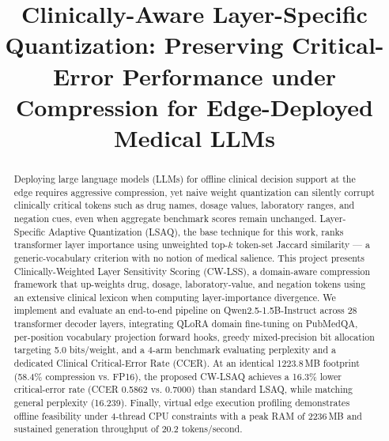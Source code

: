 \documentclass[conference]{IEEEtran}
\begin{document}
\newpage
\setcounter{page}{1}

\title{Clinically-Aware Layer-Specific Quantization: Preserving Critical-Error Performance under Compression for Edge-Deployed Medical LLMs}

\author{
}

\maketitle

\begin{abstract}
Deploying large language models (LLMs) for offline clinical decision support at the edge requires aggressive compression, yet naive weight quantization can silently corrupt clinically critical tokens such as drug names, dosage values, laboratory ranges, and negation cues, even when aggregate benchmark scores remain unchanged. Layer-Specific Adaptive Quantization (LSAQ), the base technique for this work, ranks transformer layer importance using unweighted top-$k$ token-set Jaccard similarity --- a generic-vocabulary criterion with no notion of medical salience. This project presents Clinically-Weighted Layer Sensitivity Scoring (CW-LSS), a domain-aware compression framework that up-weights drug, dosage, laboratory-value, and negation tokens using an extensive clinical lexicon when computing layer-importance divergence. We implement and evaluate an end-to-end pipeline on Qwen2.5-1.5B-Instruct across 28 transformer decoder layers, integrating QLoRA domain fine-tuning on PubMedQA, per-position vocabulary projection forward hooks, greedy mixed-precision bit allocation targeting 5.0 bits/weight, and a 4-arm benchmark evaluating perplexity and a dedicated Clinical Critical-Error Rate (CCER). At an identical 1223.8\,MB footprint (58.4\% compression vs. FP16), the proposed CW-LSAQ achieves a 16.3\% lower critical-error rate (CCER 0.5862 vs. 0.7000) than standard LSAQ, while matching general perplexity (16.239). Finally, virtual edge execution profiling demonstrates offline feasibility under 4-thread CPU constraints with a peak RAM of 2236\,MB and sustained generation throughput of 20.2 tokens/second.
\end{abstract}
\end{document}

